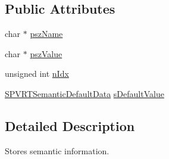 \subsection*{Public Attributes}
\begin{DoxyCompactItemize}
\item 
char $\ast$ \hyperlink{struct_s_p_v_r_t_p_f_x_parser_semantic_a6a40e2a0953155755004a27a91592b25}{psz\+Name}
\item 
char $\ast$ \hyperlink{struct_s_p_v_r_t_p_f_x_parser_semantic_a23ebe347d03719281c7a6f5d60094a13}{psz\+Value}
\item 
unsigned int \hyperlink{struct_s_p_v_r_t_p_f_x_parser_semantic_a85a4c86faaa079189b73b62f20734ea4}{n\+Idx}
\item 
\hyperlink{struct_s_p_v_r_t_semantic_default_data}{S\+P\+V\+R\+T\+Semantic\+Default\+Data} \hyperlink{struct_s_p_v_r_t_p_f_x_parser_semantic_a5858894032691240acd1eb52609c6e68}{s\+Default\+Value}
\end{DoxyCompactItemize}


\subsection{Detailed Description}
Stores semantic information. 



 

